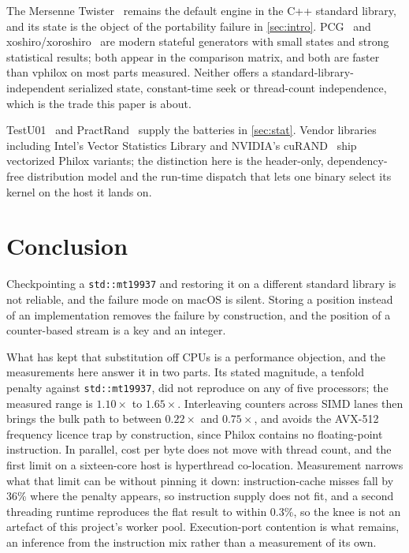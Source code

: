 \documentclass[acmsmall,screen,review]{acmart}
\theoremstyle{acmdefinition}
\newcommand{\code}[1]{\texttt{#1}}
\begin{document}
The Mersenne Twister~\cite{matsumoto1998} remains the default engine in the C++
standard library, and its state is the object of the portability failure in
\cref{sec:intro}. PCG~\cite{oneill2014} and
xoshiro/xoroshiro~\cite{blackman2021} are modern stateful generators with small
states and strong statistical results; both appear in the comparison matrix, and
both are faster than vphilox on most parts measured. Neither offers a
standard-library-independent serialized state, constant-time seek or
thread-count independence, which is the trade this paper is about.

TestU01~\cite{lecuyer2007} and PractRand~\cite{practrand} supply the batteries
in \cref{sec:stat}. Vendor libraries including Intel's Vector Statistics Library
and NVIDIA's cuRAND~\cite{curand} ship vectorized Philox variants; the
distinction here is the header-only, dependency-free distribution model and the
run-time dispatch that lets one binary select its kernel on the host it lands
on.

\section{Conclusion}\label{sec:conclusion}

Checkpointing a \code{std::mt19937} and restoring it on a different standard
library is not reliable, and the failure mode on macOS is silent. Storing a
position instead of an implementation removes the failure by construction, and
the position of a counter-based stream is a key and an integer.

What has kept that substitution off CPUs is a performance objection, and the
measurements here answer it in two parts. Its stated magnitude, a tenfold
penalty against \code{std::mt19937}, did not reproduce on any of five
processors; the measured range is $1.10\times$ to $1.65\times$. Interleaving
counters across SIMD lanes then brings the bulk path to between $0.22\times$ and
$0.75\times$, and avoids the AVX-512 frequency licence trap by construction,
since Philox contains no floating-point instruction. In parallel, cost per byte
does not move with thread count, and the first limit on a sixteen-core host is
hyperthread co-location. Measurement narrows what that limit can be without
pinning it down: instruction-cache misses fall by 36\% where the penalty
appears, so instruction supply does not fit, and a second threading runtime
reproduces the flat result to within 0.3\%, so the knee is not an artefact of
this project's worker pool. Execution-port contention is what remains, an
inference from the instruction mix rather than a measurement of its own.
\end{document}
